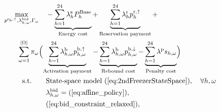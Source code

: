 {\begin{subequations}\label{P2:FinalModel}
    \begin{align}
        \underset{p^{\rm{r}_{h},\uparrow}, \lambda_{h,\omega}^{\text{bid}},\Gamma_{\omega}}{\textrm{max}} & \quad - \underbrace{\sum_{h=1}^{24} \lambda^{\rm{s}}_{h}P^{\text{Base}}_{h}}_{\textrm{Energy cost}} + \underbrace{\sum_{h=1}^{24}\lambda_{h}^{\rm{r}} p^{\rm{r}, \uparrow}_{h}}_{\textrm{Reservation payment}} +  \notag                                                                                                                                                          \\ \sum_{\omega=1}^{|\Omega|} \pi_{\omega} & \Bigl( \underbrace{\sum_{h=1}^{24}  \lambda_{h,\omega}^{\rm{b}} p^{\rm{b},\uparrow}_{h,\omega}}_{\textrm{Activation payment}} - \underbrace{\sum_{h=1}^{24}  \lambda_{h,\omega}^{\rm{b}} p^{\rm{b},\downarrow}_{h,\omega}}_{\textrm{Rebound cost}} - \underbrace{ \sum_{h=1}^{24}  \lambda^{\rm{p}}s_{h,\omega}}_{\textrm{Penalty cost}} \Bigr) \label{P2:1} \\
        \text{s.t.}
        \quad                                                                                             & \quad \text{State-space model } (\ref{eq:2ndFreezerStateSpace}), \quad \forall{h,\omega} \label{P2:2}                                                                                                                                                                                                                                                                             \\
        \quad                                                                                             & \quad \lambda_{h,\omega}^{\textrm{bid}} = (\ref{eq:affine_policy}),  \label{P2:3}                                                                                                                                                                                                                                                                                                 \\
        \quad                                                                                             & \quad (\ref{eq:bid_constraint_relaxed}), \quad  \label{P2:5}                                                                                                                                                                                                                                                                                                                      \\

\end{align}
\end{subequations}}
